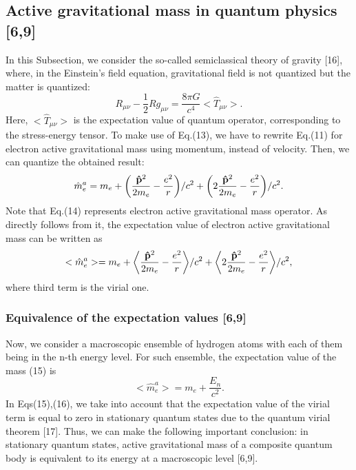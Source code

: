 \documentclass{ws-ijmpd}
\begin{document}
\subsection{Active gravitational mass in quantum physics [6,9]}

In this Subsection, we consider the so-called semiclassical theory
of gravity [16], where, in the Einstein's field equation,
gravitational field is not quantized but the matter is quantized:
\begin{equation}
R_{\mu \nu} - \frac{1}{2}R g_{\mu \nu} = \frac{8 \pi G}{c^4}
\bigl<\hat T_{\mu \nu} \bigl> .
\end{equation}
Here, $<\hat T_{\mu \nu}>$ is the expectation value of quantum
operator, corresponding to the stress-energy tensor. To make use
of Eq.(13), we have to rewrite Eq.(11) for electron active
gravitational mass using momentum, instead of velocity. Then, we
can quantize the obtained result:
\begin{equation}
\hat m^a_e = m_e +\biggl(\frac{{\bf \hat
p}^2}{2m_e}-\frac{e^2}{r}\biggl)/c^2 + \biggl(2\frac{{\bf \hat
p}^2}{2m_e}-\frac{e^2}{r}\biggl)/c^2.
\end{equation}
Note that Eq.(14) represents electron active gravitational mass
operator. As directly follows from it, the expectation value of
electron active gravitational mass can be written as
\begin{equation}
<\hat m^a_e> = m_e +\biggl< \frac{{\bf \hat
p}^2}{2m_e}-\frac{e^2}{r}\biggl>/c^2 + \biggl<2\frac{{\bf \hat
p}^2}{2m_e}-\frac{e^2}{r}\biggl>/c^2,
\end{equation}
where third term is the virial one.

\subsubsection{Equivalence of the expectation values [6,9]}

Now, we consider a macroscopic ensemble of hydrogen atoms with
each of them being in the n-th energy level. For such ensemble,
the expectation value of the mass (15) is
\begin{equation}
<\hat m^a_e> = m_e + \frac{E_n}{c^2}.
\end{equation}
In Eqs(15),(16), we take into account that the expectation value
of the virial term is equal to zero in stationary quantum states
due to the quantum virial theorem [17]. Thus, we can make the
following important conclusion: in stationary quantum states,
active gravitational mass of a composite quantum body is
equivalent to its energy at a macroscopic level [6,9].
\end{document}
